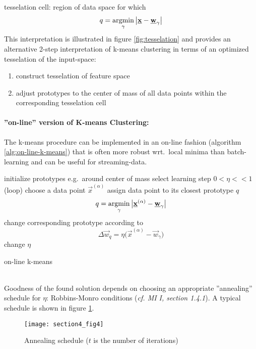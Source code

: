 tesselation cell: region of data space for which
\begin{equation}
	q = \argmin_{\gamma} \big| \vec{x} - \vec{w}_{\gamma} \big|
\end{equation}
This interpretation is illustrated in figure \ref{fig:tesselation} and provides an alternative 2-step interpretation of k-means clustering
in terms of an optimized tesselation of the input-space:
\begin{enumerate}[(1)]
\item construct tesselation of feature space
\item adjust prototypes to the center of mass of all data points 
		within the corresponding tesselation cell
\end{enumerate}

\paragraph{''on-line'' version of K-means Clustering:}
The k-means procedure can be implemented in an on-line fashion (algorithm \ref{alg:on-line-k-means}) that is often more robust wrt.\ local minima than batch-learning and can be useful for streaming-data. 
\begin{algorithm}[h]
  \DontPrintSemicolon
  initialize prototypes e.g.\ around center of mass \;
  select learning step  $0 < \eta << 1$\;
  \Begin(loop){
    choose a data point $\vec{x}^{(\alpha)}$ \;
    assign data point to its closest prototype $q$\;
    \[ q = \argmin_{\gamma} \big| \vec{x}^{(\alpha)} - \vec{w}_{\gamma} \big| \]
    change corresponding prototype according to\;
    \[ \Delta \vec{w}_q = \eta \big( \vec{x}^{(\alpha)} - \vec{w}_{\gamma} \big) \]
    change $\eta$ \;
  }
  \label{alg:on-line-k-means}
  \caption{on-line k-means}
\end{algorithm}
\\
Goodness of the found solution depends on choosing an appropriate ''annealing'' schedule for $\eta$: Robbins-Monro conditions ({\it cf. MI I, section 1.4.1}). A typical schedule is shown in figure \ref{fig:annealingScheduleKMeans}. 
\begin{figure}[h!]
  \centering
\texttt{[image: section4\_fig4]} 
  \caption{Annealing schedule ($t$ is the number of iterations)}
  \label{fig:annealingScheduleKMeans}
\end{figure}




